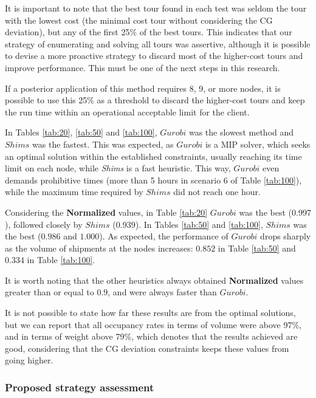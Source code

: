\documentclass[preprint]{elsarticle}
\begin{document}
{{\color{blue}
It is important to note that the best tour found in each test was seldom the tour with the lowest cost (the minimal cost tour without considering the CG deviation), but any of the first 25\% of the best tours. This indicates that our strategy of enumerating and solving all tours was assertive, although it is possible to devise a more proactive strategy to discard most of the higher-cost tours and improve performance. This must be one of the next steps in this research.

If a posterior application of this method requires 8, 9, or more nodes, it is possible to use this 25\% as a threshold to discard the higher-cost tours and keep the run time within an operational acceptable limit for the client.
}

In Tables \ref{tab:20}, \ref{tab:50} and \ref{tab:100}, $Gurobi$\/ was the slowest method and $Shims$\/ was the fastest. This was expected, as $Gurobi$\/ is a MIP solver, which seeks an optimal solution within the established constraints, usually reaching its time limit on each node, while {\it Shims} is a fast heuristic. This way, $Gurobi$\/ even demands prohibitive times (more than 5 hours in scenario 6 of Table \ref{tab:100}), while the maximum time required by $Shims$\/ did not reach one hour.

Considering the {\bf Normalized}\/ values, in Table \ref{tab:20} $Gurobi$\/ was the best ($0.997$), followed closely by $Shims$\/ ($0.939$). In Tables \ref{tab:50} and \ref{tab:100}, $Shims$ was the best ($0.986$\/ and $1.000$). As expected, the performance of $Gurobi$\/ drops sharply as the volume of shipments at the nodes increases: $0.852$\/ in Table \ref{tab:50} and $0.334$\/ in Table \ref{tab:100}.

It is worth noting that the other heuristics always obtained {\bf Normalized}\/ values greater than or equal to $0.9$, and were always faster than $Gurobi$.


	
It is not possible to state how far these results are from the optimal solutions, but we can report that all occupancy rates in terms of volume were above 97\%, and in terms of weight above 79\%, which denotes that the results achieved are good, considering that the CG deviation constraints keeps these values from going higher.


\subsubsection{Proposed strategy assessment}

}
\end{document}

